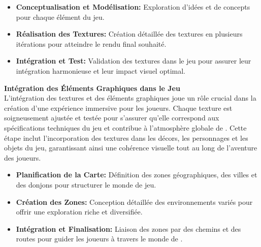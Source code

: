 \begin{itemize}

      \item \textbf{Conceptualisation et Modélisation:} Exploration d'idées et de concepts pour chaque élément du jeu.
            \\

      \item \textbf{Réalisation des Textures:} Création détaillée des textures en plusieurs itérations pour atteindre le rendu final souhaité.
            \\

      \item \textbf{Intégration et Test:} Validation des textures dans le jeu pour assurer leur intégration harmonieuse et leur impact visuel optimal.
            \\

\end{itemize}
\textbf{Intégration des Éléments Graphiques dans le Jeu}
\\

L'intégration des textures et des éléments graphiques joue un rôle crucial dans la création d'une expérience immersive pour les joueurs. Chaque texture est soigneusement ajustée et testée pour s'assurer qu'elle correspond aux spécifications techniques du jeu et contribue à l'atmosphère globale de \gameName. Cette étape inclut l'incorporation des textures dans les décors, les personnages et les objets du jeu, garantissant ainsi une cohérence visuelle tout au long de l'aventure des joueurs.
\\

\begin{itemize}

      \item \textbf{Planification de la Carte:} Définition des zones géographiques, des villes et des donjons pour structurer le monde de jeu.
            \\

      \item \textbf{Création des Zones:} Conception détaillée des environnements variés pour offrir une exploration riche et diversifiée.
            \\

      \item \textbf{Intégration et Finalisation:} Liaison des zones par des chemins et des routes pour guider les joueurs à travers le monde de \gameName.
            \\

\end{itemize}

